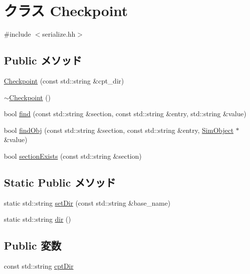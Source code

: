 \hypertarget{classCheckpoint}{
\section{クラス Checkpoint}
\label{classCheckpoint}
}


{\ttfamily \#include $<$serialize.hh$>$}\subsection*{Public メソッド}
\begin{DoxyCompactItemize}
\item 
\hyperlink{classCheckpoint_a672da1b6013f19c435e227ce818013f2}{Checkpoint} (const std::string \&cpt\_\-dir)
\item 
\hyperlink{classCheckpoint_a28d304cd3116ea8043354ce22989d2e6}{$\sim$Checkpoint} ()
\item 
bool \hyperlink{classCheckpoint_a2f74eb45a42d3bbb66dac505415a2b23}{find} (const std::string \&section, const std::string \&entry, std::string \&value)
\item 
bool \hyperlink{classCheckpoint_a9914b6054c5d5ef992db802c6649a958}{findObj} (const std::string \&section, const std::string \&entry, \hyperlink{classSimObject}{SimObject} $\ast$\&value)
\item 
bool \hyperlink{classCheckpoint_a29825a406e335b106b62bfec9d551283}{sectionExists} (const std::string \&section)
\end{DoxyCompactItemize}
\subsection*{Static Public メソッド}
\begin{DoxyCompactItemize}
\item 
static std::string \hyperlink{classCheckpoint_a6172ec664484367153b35102f9c6b9ba}{setDir} (const std::string \&base\_\-name)
\item 
static std::string \hyperlink{classCheckpoint_af15f18c4fe6e8c7fe6e0bcdb3d007d96}{dir} ()
\end{DoxyCompactItemize}
\subsection*{Public 変数}
\begin{DoxyCompactItemize}
\item 
const std::string \hyperlink{classCheckpoint_a45e71014090a29b10f5e9c4bedc84f84}{cptDir}
\end{DoxyCompactItemize}
